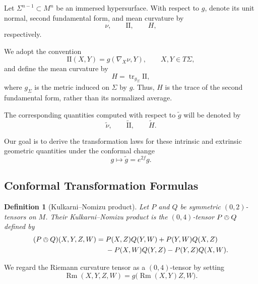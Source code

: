 \documentclass[11pt]{article}
\newtheorem{definition}[theorem]{Definition}
\newcommand{\Tr}{\operatorname{tr}}
\newcommand{\Rm}{\operatorname{Rm}}
\newcommand{\II}{\mathrm{I\!I}}
\begin{document}
Let \(\Sigma^{n-1}\subset M^n\) be an immersed hypersurface. With respect
to \(g\), denote its unit normal, second fundamental form, and mean curvature
by
\[
\nu,\qquad
\II,\qquad
H,
\]
respectively.

We adopt the convention
\[
\II(X,Y)
=
g(\nabla_X\nu,Y),
\qquad
X,Y\in T\Sigma,
\]
and define the mean curvature by
\[
H
=
\Tr_{g_\Sigma}\II,
\]
where \(g_\Sigma\) is the metric induced on \(\Sigma\) by \(g\). Thus, \(H\)
is the trace of the second fundamental form, rather than its normalized
average.

The corresponding quantities computed with respect to \(\widetilde g\)
will be denoted by
\[
\widetilde{\nu},\qquad
\widetilde{\II},\qquad
\widetilde H.
\]

Our goal is to derive the transformation laws for these intrinsic and
extrinsic geometric quantities under the conformal change
\[
g\longmapsto \widetilde g=e^{2f}g.
\]

\subsection{Conformal Transformation Formulas}

\begin{definition}[Kulkarni--Nomizu product]
Let \(P\) and \(Q\) be symmetric \((0,2)\)-tensors on \(M\).
Their Kulkarni--Nomizu product is the \((0,4)\)-tensor
\(P\owedge Q\) defined by
\[
\begin{aligned}
(P\owedge Q)(X,Y,Z,W)
={}&
P(X,Z)Q(Y,W)
+
P(Y,W)Q(X,Z)
\\
&-
P(X,W)Q(Y,Z)
-
P(Y,Z)Q(X,W).
\end{aligned}
\]
\end{definition}

We regard the Riemann curvature tensor as a \((0,4)\)-tensor by setting
\[
\Rm(X,Y,Z,W)
=
g\bigl(\Rm(X,Y)Z,W\bigr).
\]
\end{document}
